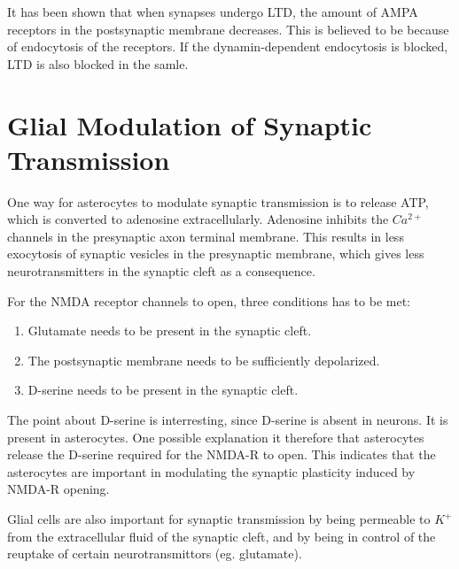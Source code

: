 It has been shown that when synapses undergo LTD, the amount of AMPA receptors in the postsynaptic membrane decreases\cite{AMPARtrafficingArtikkel}. 
This is believed to be because of endocytosis of the receptors. If the dynamin-dependent endocytosis is blocked, LTD is also blocked in the samle\cite{AMPARtrafficingArtikkel}.

\section{Glial Modulation of Synaptic Transmission}
One way for asterocytes to modulate synaptic transmission is to release ATP, which is converted to adenosine extracellularly. 
Adenosine inhibits the $Ca^{2+}$ channels in the presynaptic axon terminal membrane\cite{signallingBetweenGlialAndNeuronsInSynPlast}. 
This results in less exocytosis of synaptic vesicles in the presynaptic membrane, which gives less neurotransmitters in the synaptic cleft as a consequence\cite{signallingBetweenGlialAndNeuronsInSynPlast}.

For the NMDA receptor channels to open, three conditions has to be met:
\begin{enumerate}
	\item Glutamate needs to be present in the synaptic cleft.
	\item The postsynaptic membrane needs to be sufficiently depolarized.
	\item D-serine needs to be present in the synaptic cleft\cite{signallingBetweenGlialAndNeuronsInSynPlast}.
\end{enumerate}
The point about D-serine is interresting, since D-serine is absent in neurons. It is present in asterocytes.
One possible explanation it therefore that asterocytes release the D-serine required for the NMDA-R to open\cite{signallingBetweenGlialAndNeuronsInSynPlast}.  %
This indicates that the asterocytes are important in modulating the synaptic plasticity induced by NMDA-R opening.

Glial cells are also important for synaptic transmission by being permeable to $K^+$ from the extracellular fluid of the synaptic cleft\cite{PrinciplesOfNeuralScience4edKAP07}, 
and by being in control of the reuptake of certain neurotransmittors (eg. glutamate)\cite{PrinciplesOfNeuralScience4edKAP15}. %



